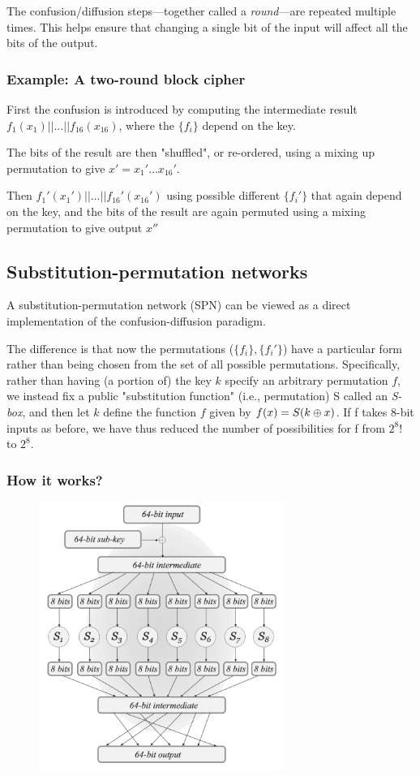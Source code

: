 \documentclass[12pt]{article}
\begin{document}
The confusion/diﬀusion steps—together called a \emph{round}—are repeated multiple times. This helps ensure that changing a single bit of the input will affect all the bits of the output.

\subsubsection{Example: A two-round block cipher}
First the confusion is introduced by computing the intermediate result $f_1(x_1)||\dots||f_{16}(x_{16})$, where the $\{f_i\}$ depend on the key. 

The bits of the result are then "shuffled", or re-ordered, using a mixing up permutation to give $x'=x_1'\dots x_{16}'$.

Then $f_1'(x_1')||\dots||f_{16}'(x_{16}')$ using possible different $\{f_i'\}$ that again depend on the key, and the bits of the result are again permuted using a mixing permutation to give output $x''$

\subsection{Substitution-permutation networks}
A substitution-permutation network (SPN) can be viewed as a direct implementation of the confusion-diﬀusion paradigm. 

The difference is that now the permutations ($\{f_i\}, \{f_i'\}$) have a particular form rather than being chosen from the set of all possible permutations. Specifically, rather than having (a portion of) the key $k$ specify an arbitrary permutation $f$, we instead fix a public "substitution function" (i.e., permutation) S called an \emph{S-box}, and then let $k$ define the function $f$ given by $f(x) = S(k \oplus x)$. If f takes 8-bit inputs as before, we have thus reduced the number of possibilities for f from $2^8!$ to $2^8$.

\subsubsection{How it works?}
\begin{figure}[ht]
    \centering
    \includegraphics[width=8cm]{figures/f3.png}
\end{figure}
\end{document}
